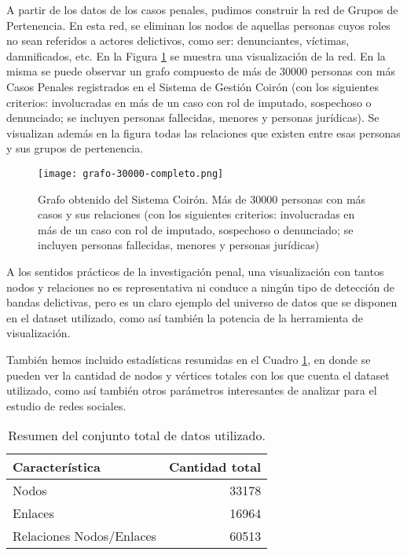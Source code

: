 A partir de los datos de los casos penales, pudimos construir la red de Grupos de Pertenencia. En esta red, se eliminan los nodos de aquellas personas cuyos roles no sean referidos a actores delictivos, como ser: denunciantes, víctimas, damnificados, etc. En la Figura \ref{fig:grafocompleto} se muestra una visualización de la red. En la misma se puede observar un grafo compuesto de más de 30000 personas con más Casos Penales registrados en el Sistema de Gestión Coirón (con los siguientes criterios: involucradas en más de un caso con rol de imputado, sospechoso o denunciado; se incluyen personas fallecidas, menores y personas jurídicas). Se visualizan además en la figura todas las relaciones que existen entre esas personas y sus grupos de pertenencia.

\begin{figure}
	\centering
	\texttt{[image: grafo-30000-completo.png]}
	\caption{Grafo obtenido del Sistema Coirón. Más de 30000 personas con más casos y sus relaciones (con los siguientes criterios: involucradas en más de un caso con rol de imputado, sospechoso o denunciado; se incluyen personas fallecidas, menores y personas jurídicas)} 
	\label{fig:grafocompleto}
\end{figure}

A los sentidos prácticos de la investigación penal, una visualización con tantos nodos y relaciones no es representativa ni conduce a ningún tipo de detección de bandas delictivas, pero es un claro ejemplo del universo de datos que se disponen en el dataset utilizado, como así también la potencia de la herramienta de visualización.

También hemos incluido estadísticas resumidas en el Cuadro  \ref{tab:EstadisticasResumidas}, en donde se pueden ver la cantidad de nodos y vértices totales con los que cuenta el dataset utilizado, como así también otros parámetros interesantes de analizar para el estudio de redes sociales.

\begin{table}
	\caption{Resumen del conjunto total de datos utilizado.}\label{tab:EstadisticasResumidas}
	\centering
	\begin{tabular}{|l|r|}
		\hline
		\textbf{Característica} &  \textbf{Cantidad total} \\
		\hline
		Nodos &  33178 \\
		\hline
		Enlaces &  16964 \\
		\hline
		Relaciones Nodos/Enlaces &  60513 \\
		\hline
	\end{tabular}
\end{table}

